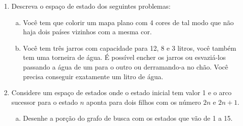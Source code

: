 \documentclass[12pt]{article}
\begin{document}
\begin{enumerate}

%
%
%





\item Descreva o espaço de estado dos seguintes problemas:
\begin{enumerate}[a)]

\item Você tem que colorir um mapa plano com 4 cores de tal modo que não haja dois países vizinhos com a mesma cor.


\item Você tem três jarros com capacidade para 12, 8 e 3 litros, você também tem uma torneira de água. É possível encher os jarros ou esvaziá-los passando a água de um para o outro ou derramando-a no chão. Você precisa conseguir exatamente um litro de água.

\end{enumerate}



\break

\item Considere um espaço de estados onde o estado inicial tem valor 1 e o arco sucessor para o estado $n$ aponta para dois filhos com os número $2n$ e $2n+1$.
\begin{enumerate}[a)]

\item Desenhe a porção do grafo de busca com os estados que vão de 1 a 15.


\end{enumerate}
\end{enumerate}
\end{document}
